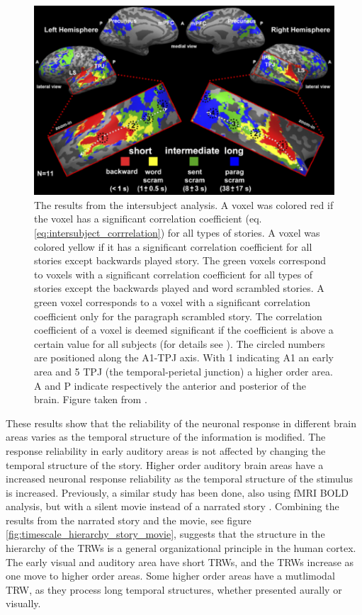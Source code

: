 \begin{figure}[!ht]
\label{fig:timescale_hierarchy}
\centering
\includegraphics[scale=0.38]{hierarchy_figures/temporal_hierarchy}
\caption{
The results from the intersubject analysis. 
A voxel was colored red if the voxel has a significant correlation coefficient (eq. \ref{eq:intersubject_corrrelation}) for all types of stories.
A voxel was colored yellow if it has a significant correlation coefficient for all stories except backwards played story.
The green voxels correspond to voxels with a significant correlation coefficient for all types of stories except the backwards played and word scrambled stories.
A green voxel corresponds to a voxel with a significant correlation coefficient only for the paragraph scrambled story.
The correlation coefficient of a voxel is deemed significant if the coefficient is above a certain value for all subjects (for details see \cite{lerner2011topographic}).
The circled numbers are positioned along the A1-TPJ axis. With 1 indicating A1 an early area and 5 TPJ (the temporal-perietal junction) a higher order area.
A and P indicate respectively the anterior and posterior of the brain.
Figure taken from \cite{lerner2011topographic}. }
\end{figure}

These results show that the reliability of the neuronal response in different brain areas varies as the temporal structure of the information is modified. The response reliability in early auditory areas is not affected by changing the temporal structure of the story. Higher order auditory brain areas have a increased neuronal response reliability as the temporal structure of the stimulus is increased.
Previously, a similar study has been done, also using fMRI BOLD analysis, but with a silent movie instead of a narrated story \cite{hasson2008hierarchy}. Combining the results from the narrated story and the movie, see figure \ref{fig:timescale_hierarchy_story_movie}, suggests that the structure in the hierarchy of the TRWs is a general organizational principle in the human cortex. The early visual and auditory area have short TRWs, and the TRWs increase as one move to higher order areas. Some higher order areas  have a  mutlimodal TRW, as they process long temporal structures, whether presented aurally or visually.


